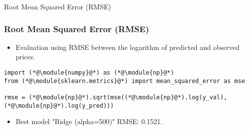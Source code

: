 \begin{frame}[fragile]{Root Mean Squared Error (RMSE)}
    \frametitle{Root Mean Squared Error (RMSE)}
    \begin{itemize}
        \item Evaluation using RMSE between the logarithm of predicted and observed prices.
    \end{itemize}
    \begin{lstlisting}[caption={Calculating RMSE using \texttt{numpy} and \texttt{sklearn}.}, label=lst:rmse_calculation]
import (*@\module{numpy}@*) as (*@\module{np}@*)
from (*@\module{sklearn.metrics}@*) import mean_squared_error as mse

rmse = (*@\module{np}@*).sqrt(mse((*@\module{np}@*).log(y_val), (*@\module{np}@*).log(y_pred)))
    \end{lstlisting}
    \begin{itemize}
        \item Best model "Ridge (alpha=500)" RMSE: 0.1521.
    \end{itemize}
\end{frame}


